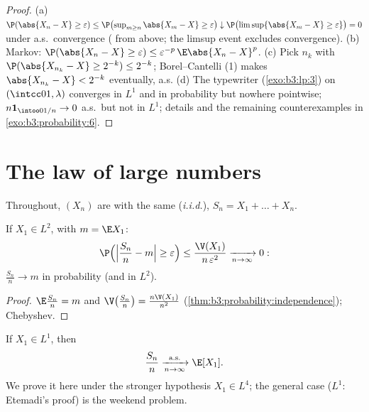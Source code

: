\begin{proof}
(a) $\P(\abs{X_n - X} \geq \varepsilon) \leq
\P\bigl(\sup_{m\geq n}\abs{X_m - X} \geq \varepsilon\bigr)
\downarrow \P\bigl(\limsup\{\abs{X_m - X} \geq
\varepsilon\}\bigr) = 0$ under a.s.\ convergence (
from above; the limsup event excludes convergence). (b)
Markov: $\P(\abs{X_n - X} \geq \varepsilon) \leq
\varepsilon^{-p}\,\E\abs{X_n - X}^p$. (c) Pick $n_k$ with
$\P(\abs{X_{n_k} - X} \geq 2^{-k}) \leq 2^{-k}$;
Borel--Cantelli (1) makes $\abs{X_{n_k} - X} < 2^{-k}$
eventually, a.s. (d) The typewriter (\cref{exo:b3:lp:3}) on
$(\intcc01, \lambda)$ converges in $L^1$ and in probability
but nowhere pointwise; $n\mathbf 1_{\intoo0{1/n}} \to 0$
a.s.\ but not in $L^1$; details and the remaining
counterexamples in \cref{exo:b3:probability:6}.
\end{proof}

\section{The law of large numbers}

Throughout, $(X_n)$ are  with the same 
(\emph{i.i.d.}), $S_n = X_1 + \dots + X_n$.

\begin{theorem}
\label{thm:b3:probability:wlln}
If $X_1 \in L^2$, with $m = \E X_1$:
\[
\P\Bigl(\Bigl|\frac{S_n}{n} - m\Bigr| \geq
\varepsilon\Bigr) \leq
\frac{\V(X_1)}{n\,\varepsilon^2}
\xrightarrow[n\to\infty]{} 0 :
\]
$\frac{S_n}n \to m$ in probability (and in $L^2$).
\end{theorem}

\begin{proof}
$\E\frac{S_n}n = m$ and $\V\bigl(\frac{S_n}n\bigr) =
\frac{n\V(X_1)}{n^2}$
(\cref{thm:b3:probability:independence}); Chebyshev.
\end{proof}

\begin{theorem}
\label{thm:b3:probability:slln}
If $X_1 \in L^1$, then
\[
\frac{S_n}{n} \xrightarrow[n\to\infty]{\text{a.s.}} \E[X_1].
\]
We prove it here under the stronger hypothesis $X_1 \in
L^4$; the general case ($L^1$: Etemadi's proof) is the
weekend problem.
\end{theorem}

